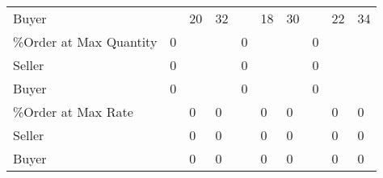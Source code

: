 \begin{tabular}{llllllllll}
 Buyer                  &          & 20            & 32            &          & 18            & 30            &           & 22            & 34            \\
 \%Order at Max Quantity & 0        &               &               & 0        &               &               & 0         &               &               \\
 Seller                 & 0        &               &               & 0        &               &               & 0         &               &               \\
 Buyer                  & 0        &               &               & 0        &               &               & 0         &               &               \\
 \%Order at Max Rate     &          & 0             & 0             &          & 0             & 0             &           & 0             & 0             \\
 Seller                 &          & 0             & 0             &          & 0             & 0             &           & 0             & 0             \\
 Buyer                  &          & 0             & 0             &          & 0             & 0             &           & 0             & 0             \\
\hline
\end{tabular}